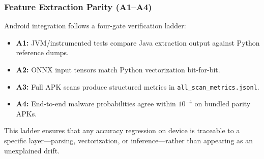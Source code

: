 \subsubsection{Feature Extraction Parity (A1--A4)}
Android integration follows a four-gate verification ladder:
\begin{itemize}
 \item \textbf{A1:} JVM/instrumented tests compare Java extraction output against Python reference dumps.
 \item \textbf{A2:} ONNX input tensors match Python vectorization bit-for-bit.
 \item \textbf{A3:} Full APK scans produce structured metrics in \texttt{all\_scan\_metrics.jsonl}.
 \item \textbf{A4:} End-to-end malware probabilities agree within $10^{-4}$ on bundled parity APKs.
\end{itemize}
This ladder ensures that any accuracy regression on device is traceable to a specific layer---parsing, vectorization, or inference---rather than appearing as an unexplained drift.

\FloatBarrier

\endinput